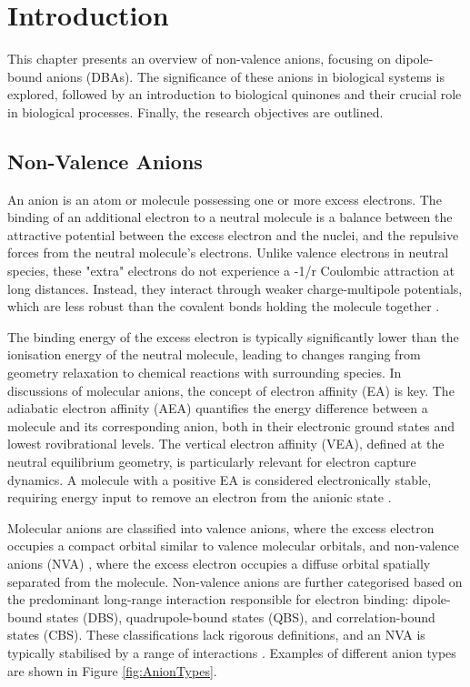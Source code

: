 \chapter{Introduction}\label{ch:introduction}
This chapter presents an overview of non-valence anions, focusing on dipole-bound anions (DBAs). The significance of these anions in biological systems is explored, followed by an introduction to biological quinones and their crucial role in biological processes. Finally, the research objectives are outlined.

\section{Non-Valence Anions}
An anion is an atom or molecule possessing one or more excess electrons. The binding of an additional electron to a neutral molecule is a balance between the attractive potential between the excess electron and the nuclei, and the repulsive forces from the neutral molecule's electrons. Unlike valence electrons in neutral species, these "extra" electrons do not experience a -1/r Coulombic attraction at long distances. Instead, they interact through weaker charge-multipole potentials, which are less robust than the covalent bonds holding the molecule together \cite{simons2008molecular, herbert2015quantum}.

The binding energy of the excess electron is typically significantly lower than the ionisation energy of the neutral molecule, leading to changes ranging from geometry relaxation to chemical reactions with surrounding species. In discussions of molecular anions, the concept of electron affinity (EA) is key. The adiabatic electron affinity (AEA) quantifies the energy difference between a molecule and its corresponding anion, both in their electronic ground states and lowest rovibrational levels. The vertical electron affinity (VEA), defined at the neutral equilibrium geometry, is particularly relevant for electron capture dynamics. A molecule with a positive EA is considered electronically stable, requiring energy input to remove an electron from the anionic state \cite{simons2008molecular}.

Molecular anions are classified into valence anions, where the excess electron occupies a compact orbital similar to valence molecular orbitals, and non-valence anions (NVA) , where the excess electron occupies a diffuse orbital spatially separated from the molecule. Non-valence anions are further categorised based on the predominant long-range interaction responsible for electron binding: dipole-bound states (DBS), quadrupole-bound states (QBS), and correlation-bound states (CBS). These classifications lack rigorous definitions, and an NVA is typically stabilised by a range of interactions \cite{simons2008molecular,herbert2015quantum,abdoul1998electrons,simons2023molecular,jordan2003theory}. Examples of different anion types are shown in Figure \ref{fig:AnionTypes}.

